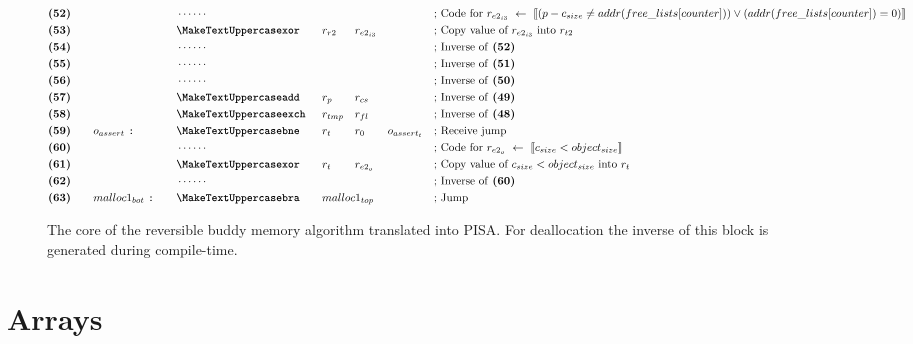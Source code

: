 \begin{figure}[ht]
{\begin{minipage}{\linewidth}
\begin{alignat*}{7}
    &\textbf{(52)}\quad&& &&\cdots\cdots && && && &&\text{; Code for $r_{e2_{i3}}\ \leftarrow\ \llbracket (p - c_{size} \neq addr(free\_lists[counter])) \vee (addr(free\_lists[counter]) = 0) \rrbracket$}\\
    &\textbf{(53)}\quad&& &&\inst{xor} &&r_{r2} && r_{e2_{i3}} && && \text{; Copy value of $r_{e2_{i3}}$ into $r_{t2}$}\\
    &\textbf{(54)}\quad&& &&\cdots\cdots && && && &&\text{; Inverse of \textbf{(52)}}\\
    &\textbf{(55)}\quad&& &&\cdots\cdots && && && &&\text{; Inverse of \textbf{(51)}}\\
    &\textbf{(56)}\quad&& &&\cdots\cdots && && && &&\text{; Inverse of \textbf{(50)}}\\
    &\textbf{(57)}\quad&& &&\inst{add} &&r_{p} && r_{cs} && && \text{; Inverse of \textbf{(49)}}\\
    &\textbf{(58)}\quad&& &&\inst{exch} &&r_{tmp} && r_{fl} && && \text{; Inverse of \textbf{(48)}}\\
    &\textbf{(59)}\quad&&o_{assert}\ \texttt{:}\quad &&\inst{bne} &&r_{t} && r_0 && o_{assert_t} && \text{; Receive jump}\\
    &\textbf{(60)}\quad&& &&\cdots\cdots && && && &&\text{; Code for $r_{e2_o}\ \leftarrow\ \llbracket c_{size} < object_{size} \rrbracket$}\\
    &\textbf{(61)}\quad&& &&\inst{xor}\quad &&r_t && r_{e2_o} && &&\text{; Copy value of $c_{size} < object_{size}$ into $r_t$}\\        
    &\textbf{(62)}\quad&& &&\cdots\cdots && && && &&\text{; Inverse of \textbf{(60)}}\\ 
    &\textbf{(63)}\quad&&malloc1_{bot}\ \texttt{:}\quad  &&\inst{bra}\quad &&malloc1_{top} \span\omit\span\quad \span\omit\span\quad &&\text{; Jump}\\
    \end{alignat*}
    \end{minipage}
    }
    
    \caption{The core of the reversible buddy memory algorithm translated into PISA. For deallocation the inverse of this block is generated during compile-time.}
    \label{fig:malloc1-pisa} 
    \end{figure}

\newpage

\section{Arrays}
\label{sec:arrays}

